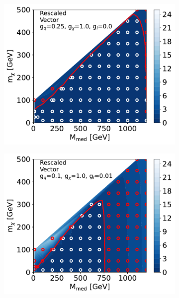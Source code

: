\documentclass[a4paper, 11pt]{article}
\begin{document}
\begin{figure}[htp!]
  \begin{center}
  \begin{subfigure}[b]{0.49\textwidth}  
    \includegraphics[width=\textwidth]{figures/monox/EXOT-2016-32_V_gq0p25_gchi1p0_compare.pdf}
    \caption{}
    \label{subfig:monophoton_V1}
  \end{subfigure}
  \begin{subfigure}[b]{0.49\textwidth}  
    \includegraphics[width=\textwidth]{figures/monox/EXOT-2016-32_V_gq0p1_gl0p01_gchi1p0_compare.pdf}
    \caption{}
    \label{subfig:monophoton_V2}  
  \end{subfigure}
  

\end{center}
\end{figure}
\end{document}
